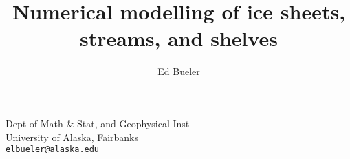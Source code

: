 %
%
%




\usepackage{times}
{
  \usepackage[left=1.5cm,right=6cm,top=1.5cm,bottom=3cm]{geometry}
}

\usepackage{hyperref}

\usepackage[T1]{fontenc}

\usepackage{verbatim}
\usepackage{empheq}
\usepackage{color}
\usepackage{animate}
\usepackage{graphicx}


\def\lecturename{Numerical modelling of ice sheets, streams, and shelves}

\title[Numerical modelling of ice sheets]{Numerical modelling of ice sheets, streams, and shelves}

\author[Bueler]{Ed Bueler}

\institute
{
  Dept of Math \& Stat, and Geophysical Inst \\
  University of Alaska, Fairbanks \\
  \texttt{elbueler@alaska.edu}
}







